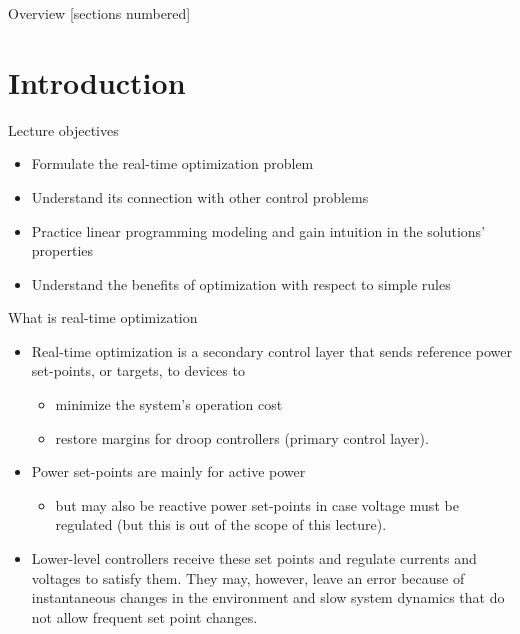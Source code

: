 \titleframe

\begin{frame}{Overview}
  [sections numbered]
  \tableofcontents[hideallsubsections]
\end{frame}

\section{Introduction}

\begin{frame} {Lecture objectives}
    \begin{itemize}
        \item Formulate the real-time optimization problem
        \item Understand its connection with other control problems
        \item Practice linear programming modeling and gain intuition in the solutions' properties
        \item Understand the benefits of optimization with respect to simple rules
    \end{itemize}
\end{frame}

\begin{frame} {What is real-time optimization}
\begin{itemize}
\item Real-time optimization is a secondary control layer that sends reference power set-points, or targets, to devices to 
\begin{itemize}
    \item minimize the system's operation cost
    \item restore margins for droop controllers (primary control layer). 
\end{itemize}  
\item Power set-points are mainly for active power  
\begin{itemize}
    \item but may also be reactive power set-points in case voltage must be regulated (but this is out of the scope of this lecture).
\end{itemize}
\item Lower-level controllers receive these set points and regulate currents and voltages to satisfy them. They may, however, leave an error because of instantaneous changes in the environment and slow system dynamics that do not allow frequent set point changes.
\end{itemize}
\end{frame}

